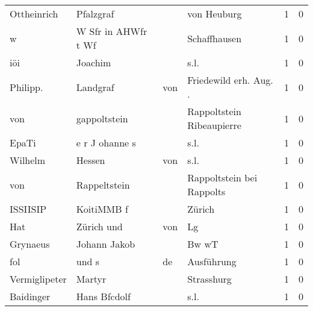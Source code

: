 \begin{tabular}{llllrr}
              Ottheinrich &                          Pfalzgraf &             &                                 von Heuburg &          1 &         0 \\
                        w &                W Sfr in AHWfr t Wf &             &                                Schaffhausen &          1 &         0 \\
                      iöi &                            Joachim &             &                                        s.l. &          1 &         0 \\
                 Philipp. &                           Landgraf &         von &                     Friedewild erh. Aug. .  &          1 &         0 \\
                      von &                       gappoltstein &             &                   Rappoltstein Ribeaupierre &          1 &         0 \\
                    EpaTi &                     e r J ohanne s &             &                                        s.l. &          1 &         0 \\
                  Wilhelm &                             Hessen &         von &                                        s.l. &          1 &         0 \\
                      von &                       Rappeltstein &             &                   Rappoltstein bei Rappolts &          1 &         0 \\
                 ISSIISIP &                         KoitiMMB f &             &                                      Zürich &          1 &         0 \\
                      Hat &                         Zürich und &         von &                                          Lg &          1 &         0 \\
                 Grynaeus &                       Johann Jakob &             &                                       Bw wT &          1 &         0 \\
                      fol &                              und s &          de &                                  Ausführung &          1 &         0 \\
            Vermiglipeter &                             Martyr &             &                                  Strasshurg &          1 &         0 \\
                Baidinger &                       Hans Bfcdolf &             &                                        s.l. &          1 &         0 \\

\end{tabular}
